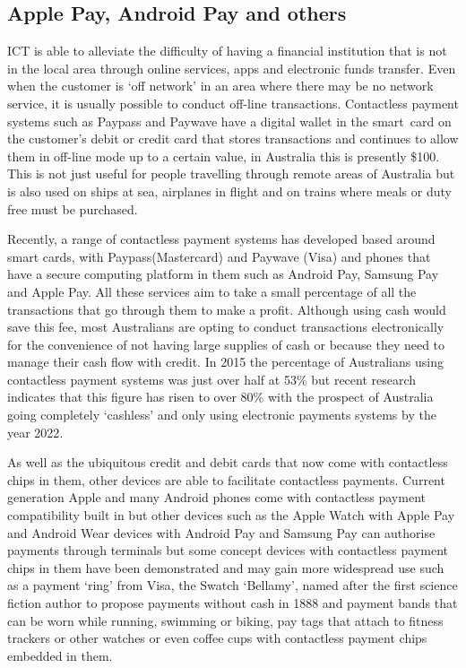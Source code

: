 \subsection{Apple Pay, Android Pay and others}
 ICT is able to alleviate the difficulty of having a financial institution that is not in the local area through online services, apps and electronic funds transfer. Even when the customer is `off network' in an area where there may be no network service, it is usually possible to conduct off-line transactions. Contactless payment systems such as Paypass and Paywave have a digital wallet in the smart~card on the customer's debit or credit card that stores transactions and continues to allow them in off-line mode up to a certain value, in Australia this is presently \$100\cite[p92]{RefWorks:260}. This is not just useful for people travelling through remote areas of Australia but is also used on ships at sea, airplanes in flight and on trains where meals or duty free must be purchased.
 
Recently, a range of contactless payment systems has developed based around smart cards, with Paypass(Mastercard) and Paywave (Visa) and phones that have  a secure computing platform in them such as Android Pay, Samsung Pay and Apple Pay. All these services aim to take a small percentage of all the transactions that go through them to make a profit. Although using cash would save this fee, most Australians \cite{RefWorks:267} are opting to conduct transactions electronically for the convenience of not having large supplies of cash or because they need to manage their cash flow with credit. In 2015 the percentage of Australians using contactless payment systems was just over half at 53\% but recent research indicates that this figure has risen to over 80\% \cite{RefWorks:261} with the prospect of Australia going completely `cashless' and only using electronic payments systems by the year 2022\cite{RefWorks:262}.

As well as the ubiquitous credit and debit cards that now come with contactless chips in them, other devices are able to facilitate contactless payments. Current generation Apple and many Android phones  come with contactless payment compatibility built in but other devices such as the Apple Watch with Apple Pay and Android Wear devices with Android Pay and Samsung Pay can authorise payments through terminals but some concept devices with contactless payment chips in them have been demonstrated and may gain more widespread use such as a payment `ring' from Visa\cite{RefWorks:263}, the Swatch `Bellamy'\cite{RefWorks:264}, named after the first science fiction author to propose payments without cash in 1888 and payment bands that can be worn while running, swimming or biking, pay tags that attach to fitness trackers or other watches or even coffee cups with contactless payment chips embedded in them\cite{RefWorks:265}.

